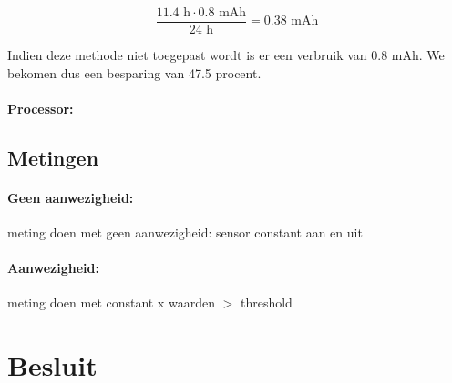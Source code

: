 \documentclass[]{article}
\begin{document}
\begin{equation}
	\frac{11.4 \text{ h}\cdot 0.8 \text{ mAh}}{24 \text{ h}} = 0.38 \text{ mAh}
\end{equation}

Indien deze methode niet toegepast wordt is er een verbruik van 0.8 mAh. We bekomen dus een besparing van 47.5 procent. 
\paragraph{Processor: }

\subsection{Metingen}
\paragraph{Geen aanwezigheid: }
meting doen met geen aanwezigheid: sensor constant aan en uit

\paragraph{Aanwezigheid: }
meting doen met constant x waarden $>$ threshold


\section{Besluit }
\end{document}
